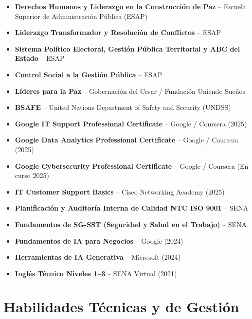 \documentclass[10pt, letterpaper]{article}
\begin{document}
\begin{itemize}
  \item \textbf{Derechos Humanos y Liderazgo en la Construcción de Paz} -- Escuela Superior de Administración Pública (ESAP)
  \item \textbf{Liderazgo Transformador y Resolución de Conflictos} -- ESAP
  \item \textbf{Sistema Político Electoral, Gestión Pública Territorial y ABC del Estado} -- ESAP
  \item \textbf{Control Social a la Gestión Pública} -- ESAP
  \item \textbf{Líderes para la Paz} -- Gobernación del Cesar / Fundación Uniendo Sueños
  \item \textbf{BSAFE} -- United Nations Department of Safety and Security (UNDSS)
  \item \textbf{Google IT Support Professional Certificate} -- Google / Coursera (2025)
  \item \textbf{Google Data Analytics Professional Certificate} -- Google / Coursera (2025)
  \item \textbf{Google Cybersecurity Professional Certificate} -- Google / Coursera (En curso 2025)
  \item \textbf{IT Customer Support Basics} -- Cisco Networking Academy (2025)
  \item \textbf{Planificación y Auditoría Interna de Calidad NTC ISO 9001} -- SENA
  \item \textbf{Fundamentos de SG-SST (Seguridad y Salud en el Trabajo)} -- SENA
  \item \textbf{Fundamentos de IA para Negocios} -- Google (2024)
  \item \textbf{Herramientas de IA Generativa} -- Microsoft (2024)
  \item \textbf{Inglés Técnico Niveles 1--3} -- SENA Virtual (2021)
\end{itemize}

\section*{Habilidades Técnicas y de Gestión}
\vspace{-2pt}
\end{document}
